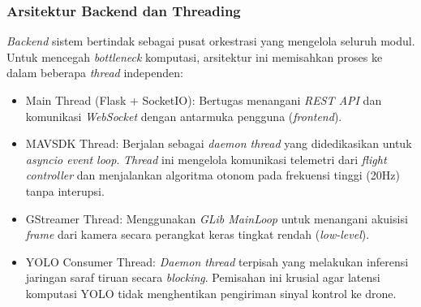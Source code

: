 \subsubsection{Arsitektur Backend dan Threading}
\textit{Backend} sistem bertindak sebagai pusat orkestrasi yang mengelola seluruh modul. Untuk mencegah \textit{bottleneck} komputasi, arsitektur ini memisahkan proses ke dalam beberapa \textit{thread} independen:
\begin{itemize}
	\item Main Thread (Flask + SocketIO): Bertugas menangani \textit{REST API} dan komunikasi \textit{WebSocket} dengan antarmuka pengguna (\textit{frontend}).
	\item MAVSDK Thread: Berjalan sebagai \textit{daemon thread} yang didedikasikan untuk \textit{asyncio event loop}. \textit{Thread} ini mengelola komunikasi telemetri dari \textit{flight controller} dan menjalankan algoritma otonom pada frekuensi tinggi (20Hz) tanpa interupsi.
	\item GStreamer Thread: Menggunakan \textit{GLib MainLoop} untuk menangani akuisisi \textit{frame} dari kamera secara perangkat keras tingkat rendah (\textit{low-level}).
	\item YOLO Consumer Thread: \textit{Daemon thread} terpisah yang melakukan inferensi jaringan saraf tiruan secara \textit{blocking}. Pemisahan ini krusial agar latensi komputasi YOLO tidak menghentikan pengiriman sinyal kontrol ke drone.
\end{itemize}

